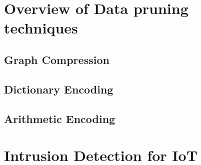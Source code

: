 \section{Overview of Data pruning techniques}

\subsection{Graph Compression}

\subsection{Dictionary Encoding}

\subsection{Arithmetic Encoding}


\section{Intrusion Detection for IoT}



